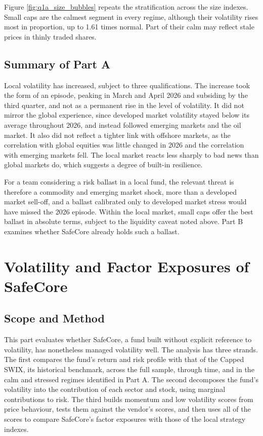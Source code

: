 \documentclass[11pt,preprint]{elsarticle}
\numberwithin{equation}{section}
\numberwithin{figure}{section}
\numberwithin{table}{section}
\begin{document}
Figure \ref{fig:q1a_size_bubbles} repeats the stratification across the
size indexes. Small caps are the calmest segment in every regime,
although their volatility rises most in proportion, up to 1.61 times
normal. Part of their calm may reflect stale prices in thinly traded
shares.

\subsection{Summary of Part A}\label{summary-of-part-a}

Local volatility has increased, subject to three qualifications. The
increase took the form of an episode, peaking in March and April 2026
and subsiding by the third quarter, and not as a permanent rise in the
level of volatility. It did not mirror the global experience, since
developed market volatility stayed below its average throughout 2026,
and instead followed emerging markets and the oil market. It also did
not reflect a tighter link with offshore markets, as the correlation
with global equities was little changed in 2026 and the correlation with
emerging markets fell. The local market reacts less sharply to bad news
than global markets do, which suggests a degree of built-in resilience.

For a team considering a risk ballast in a local fund, the relevant
threat is therefore a commodity and emerging market shock, more than a
developed market sell-off, and a ballast calibrated only to developed
market stress would have missed the 2026 episode. Within the local
market, small caps offer the best ballast in absolute terms, subject to
the liquidity caveat noted above. Part B examines whether SafeCore
already holds such a ballast.

\section{\texorpdfstring{Volatility and Factor Exposures of SafeCore
\label{PartB}}{Volatility and Factor Exposures of SafeCore }}\label{volatility-and-factor-exposures-of-safecore}

\subsection{Scope and Method}\label{scope-and-method-1}

This part evaluates whether SafeCore, a fund built without explicit
reference to volatility, has nonetheless managed volatility well. The
analysis has three strands. The first compares the fund's return and
risk profile with that of the Capped SWIX, its historical benchmark,
across the full sample, through time, and in the calm and stressed
regimes identified in Part A. The second decomposes the fund's
volatility into the contribution of each sector and stock, using
marginal contributions to risk. The third builds momentum and low
volatility scores from price behaviour, tests them against the vendor's
scores, and then uses all of the scores to compare SafeCore's factor
exposures with those of the local strategy indexes.
\end{document}
